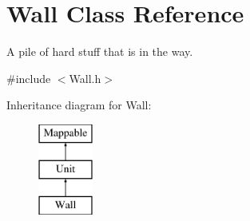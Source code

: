 \hypertarget{classWall}{
\section{Wall Class Reference}
\label{classWall}
}


A pile of hard stuff that is in the way.  




{\ttfamily \#include $<$Wall.h$>$}

Inheritance diagram for Wall:\begin{figure}[H]
\begin{center}
\leavevmode
\includegraphics[height=3cm]{classWall}
\end{center}
\end{figure}
